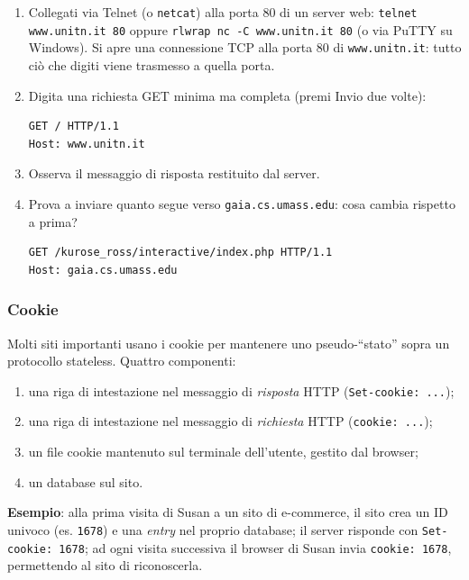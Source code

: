 \documentclass[12pt, a4paper]{article}
\begin{document}
\begin{tcolorbox}[colback=orange!5, colframe=orange!70!black, title=\textbf{Esercizio pratico 2.1 -- Dialogare a mano con un server HTTP}]
\begin{enumerate}
    \item Collegati via Telnet (o \texttt{netcat}) alla porta 80 di un server web: \texttt{telnet www.unitn.it 80} oppure \texttt{rlwrap nc -C www.unitn.it 80} (o via PuTTY su Windows). Si apre una connessione TCP alla porta 80 di \texttt{www.unitn.it}: tutto ciò che digiti viene trasmesso a quella porta.
    \item Digita una richiesta GET minima ma completa (premi Invio due volte):
\begin{verbatim}
GET / HTTP/1.1
Host: www.unitn.it
\end{verbatim}
    \item Osserva il messaggio di risposta restituito dal server.
    \item Prova a inviare quanto segue verso \texttt{gaia.cs.umass.edu}: cosa cambia rispetto a prima?
\begin{verbatim}
GET /kurose_ross/interactive/index.php HTTP/1.1
Host: gaia.cs.umass.edu
\end{verbatim}
\end{enumerate}
\end{tcolorbox}

\subsubsection{Cookie}

Molti siti importanti usano i cookie per mantenere uno pseudo-``stato'' sopra un protocollo stateless. Quattro componenti:
\begin{enumerate}
    \item una riga di intestazione nel messaggio di \textit{risposta} HTTP (\texttt{Set-cookie: ...});
    \item una riga di intestazione nel messaggio di \textit{richiesta} HTTP (\texttt{cookie: ...});
    \item un file cookie mantenuto sul terminale dell'utente, gestito dal browser;
    \item un database sul sito.
\end{enumerate}

\textbf{Esempio}: alla prima visita di Susan a un sito di e-commerce, il sito crea un ID univoco (es. \texttt{1678}) e una \textit{entry} nel proprio database; il server risponde con \texttt{Set-cookie: 1678}; ad ogni visita successiva il browser di Susan invia \texttt{cookie: 1678}, permettendo al sito di riconoscerla.
\end{document}
